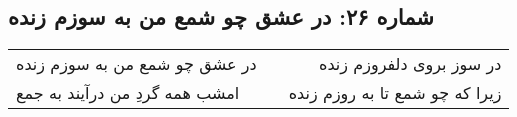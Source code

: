 \begin{center}
\section*{شماره ۲۶: در عشق چو شمع من به سوزم زنده}
\label{sec:026}
\begin{longtable}{l p{0.5cm} r}
در عشق چو شمع من به سوزم زنده
&&
در سوز بروی دلفروزم زنده
\\
امشب همه گردِ من درآیند به جمع
&&
زیرا که چو شمع تا به روزم زنده
\\
\end{longtable}
\end{center}
